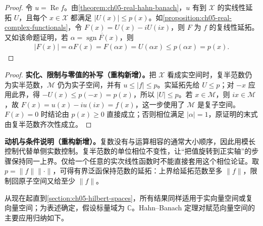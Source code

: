 \documentclass[../../main.tex]{subfiles}
\begin{document}
\begin{proof}
令 $u=\operatorname{Re}f$。由\cref{theorem:ch05-real-hahn-banach}，$u$ 有到 $\mathcal X$ 的实线性延拓 $U$，且每个 $x\in\mathcal X$ 都满足 $|U(x)|\le p(x)$。如\cref{proposition:ch05-real-complex-functionals}，令 $F(x)=U(x)-iU(ix)$，则 $F$ 为 $f$ 的复线性延拓。又如该命题证明，若 $\alpha=\overline{\operatorname{sgn}F(x)}$，则
\begin{align*}
|F(x)|=\alpha F(x)=F(\alpha x)=U(\alpha x)\le p(\alpha x)=p(x).
\end{align*}
\end{proof}
\begin{proof}
\textbf{实化、限制与零值的补写（重构新增）。}把 $\mathcal X$ 看成实空间时，复半范数仍为实半范数，$\mathcal M$ 仍为实子空间，并有 $u\le|f|\le p$。实延拓先给 $U\le p$；对 $-x$ 应用此界，得 $-U(x)\le p(-x)=p(x)$，所以 $|U|\le p$。若 $x\in\mathcal M$，则 $ix\in\mathcal M$，故 $F(x)=u(x)-iu(ix)=f(x)$，这一步使用了 $\mathcal M$ 是复子空间。$F(x)=0$ 时结论由 $p(x)\ge0$ 直接成立；否则相位满足 $|\alpha|=1$，原证明的末式由复半范数齐次性成立。
\end{proof}
\begin{remark}
\textbf{动机与条件说明（重构新增）。}复数没有与运算相容的通常大小顺序，因此用模长控制代替单侧实数控制。复半范数的单位相位不变性，让“把值旋转到正实轴”的步骤保持同一上界。仅给一个任意的实次线性函数时不能直接套用这个相位论证。取 $p=\|f\|\|\cdot\|$，可得有界泛函保持范数的延拓：上界给延拓范数至多 $\|f\|$，限制回原子空间又给至少 $\|f\|$。
\end{remark}
从现在起直到\cref{section:ch05-hilbert-spaces}，所有结果同样适用于实向量空间或复向量空间；为表述确定，假设标量域为 $\mathbb C$。Hahn--Banach 定理对赋范向量空间的主要应用归纳如下。
\end{document}
